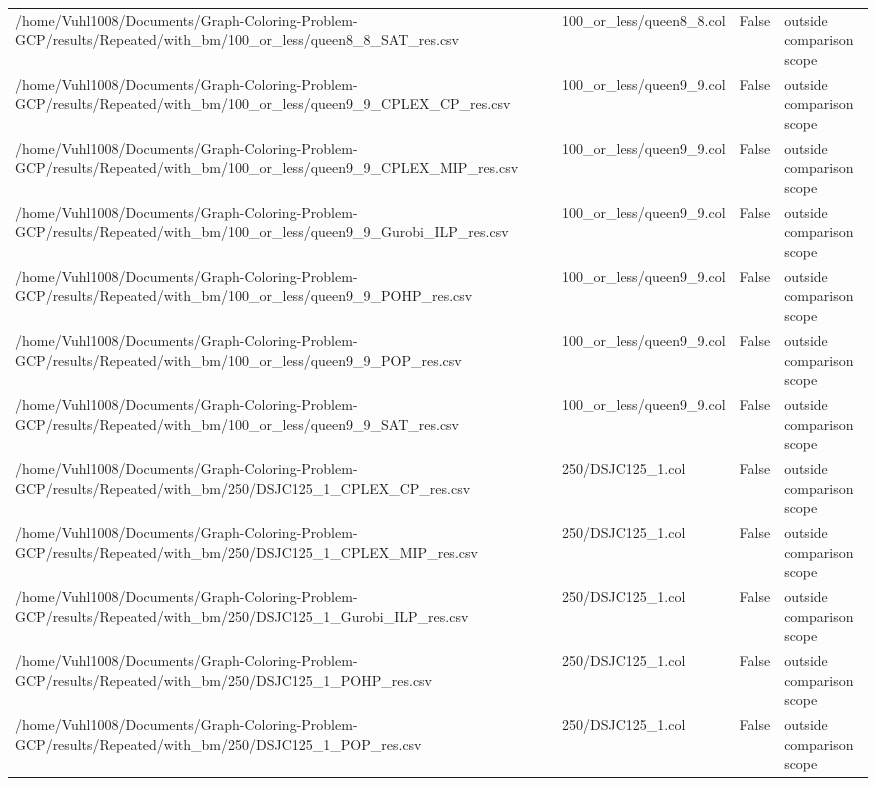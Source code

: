 \begin{table}[htbp]
\begin{tabular}{llll}
/home/Vuhl1008/Documents/Graph-Coloring-Problem-GCP/results/Repeated/with\_bm/100\_or\_less/queen8\_8\_SAT\_res.csv & 100\_or\_less/queen8\_8.col & False & outside comparison scope \\
/home/Vuhl1008/Documents/Graph-Coloring-Problem-GCP/results/Repeated/with\_bm/100\_or\_less/queen9\_9\_CPLEX\_CP\_res.csv & 100\_or\_less/queen9\_9.col & False & outside comparison scope \\
/home/Vuhl1008/Documents/Graph-Coloring-Problem-GCP/results/Repeated/with\_bm/100\_or\_less/queen9\_9\_CPLEX\_MIP\_res.csv & 100\_or\_less/queen9\_9.col & False & outside comparison scope \\
/home/Vuhl1008/Documents/Graph-Coloring-Problem-GCP/results/Repeated/with\_bm/100\_or\_less/queen9\_9\_Gurobi\_ILP\_res.csv & 100\_or\_less/queen9\_9.col & False & outside comparison scope \\
/home/Vuhl1008/Documents/Graph-Coloring-Problem-GCP/results/Repeated/with\_bm/100\_or\_less/queen9\_9\_POHP\_res.csv & 100\_or\_less/queen9\_9.col & False & outside comparison scope \\
/home/Vuhl1008/Documents/Graph-Coloring-Problem-GCP/results/Repeated/with\_bm/100\_or\_less/queen9\_9\_POP\_res.csv & 100\_or\_less/queen9\_9.col & False & outside comparison scope \\
/home/Vuhl1008/Documents/Graph-Coloring-Problem-GCP/results/Repeated/with\_bm/100\_or\_less/queen9\_9\_SAT\_res.csv & 100\_or\_less/queen9\_9.col & False & outside comparison scope \\
/home/Vuhl1008/Documents/Graph-Coloring-Problem-GCP/results/Repeated/with\_bm/250/DSJC125\_1\_CPLEX\_CP\_res.csv & 250/DSJC125\_1.col & False & outside comparison scope \\
/home/Vuhl1008/Documents/Graph-Coloring-Problem-GCP/results/Repeated/with\_bm/250/DSJC125\_1\_CPLEX\_MIP\_res.csv & 250/DSJC125\_1.col & False & outside comparison scope \\
/home/Vuhl1008/Documents/Graph-Coloring-Problem-GCP/results/Repeated/with\_bm/250/DSJC125\_1\_Gurobi\_ILP\_res.csv & 250/DSJC125\_1.col & False & outside comparison scope \\
/home/Vuhl1008/Documents/Graph-Coloring-Problem-GCP/results/Repeated/with\_bm/250/DSJC125\_1\_POHP\_res.csv & 250/DSJC125\_1.col & False & outside comparison scope \\
/home/Vuhl1008/Documents/Graph-Coloring-Problem-GCP/results/Repeated/with\_bm/250/DSJC125\_1\_POP\_res.csv & 250/DSJC125\_1.col & False & outside comparison scope \\

\end{tabular}
\end{table}

